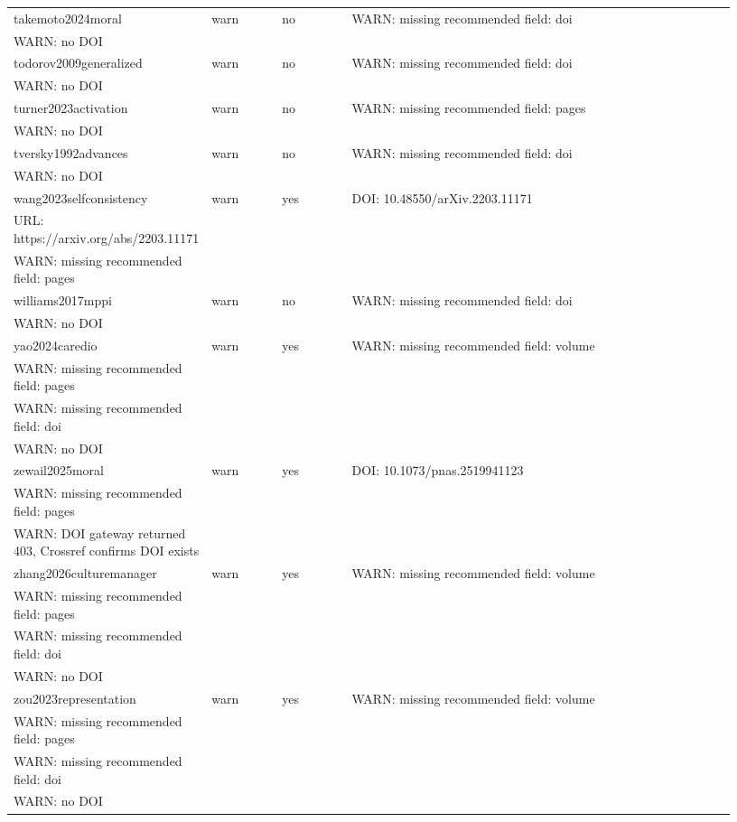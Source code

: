 \documentclass[11pt]{article}
\begin{document}
\begin{longtable}{p{0.18\linewidth}p{0.1\linewidth}p{0.1\linewidth}p{0.55\linewidth}}
takemoto2024moral & warn & no & WARN: missing recommended field: doi \\ WARN: no DOI \\
todorov2009generalized & warn & no & WARN: missing recommended field: doi \\ WARN: no DOI \\
turner2023activation & warn & no & WARN: missing recommended field: pages \\ WARN: no DOI \\
tversky1992advances & warn & no & WARN: missing recommended field: doi \\ WARN: no DOI \\
wang2023selfconsistency & warn & yes & DOI: 10.48550/arXiv.2203.11171 \\ URL: https://arxiv.org/abs/2203.11171 \\ WARN: missing recommended field: pages \\
williams2017mppi & warn & no & WARN: missing recommended field: doi \\ WARN: no DOI \\
yao2024caredio & warn & yes & WARN: missing recommended field: volume \\ WARN: missing recommended field: pages \\ WARN: missing recommended field: doi \\ WARN: no DOI \\
zewail2025moral & warn & yes & DOI: 10.1073/pnas.2519941123 \\ WARN: missing recommended field: pages \\ WARN: DOI gateway returned 403, Crossref confirms DOI exists \\
zhang2026culturemanager & warn & yes & WARN: missing recommended field: volume \\ WARN: missing recommended field: pages \\ WARN: missing recommended field: doi \\ WARN: no DOI \\
zou2023representation & warn & yes & WARN: missing recommended field: volume \\ WARN: missing recommended field: pages \\ WARN: missing recommended field: doi \\ WARN: no DOI \\
\bottomrule
\end{longtable}
\end{document}
